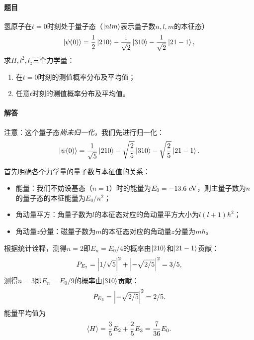 \begin{tcolorbox}[breakable, title={\textbf{氢原子能级叠加态}}]
    \paragraph{题目}
    氢原子在$t=0$时刻处于量子态（$\ket{nlm}$表示量子数$n,l,m$的本征态）
    \begin{equation}
        \ket{\psi(0)} = \frac12\ket{210} - \frac{1}{\sqrt{2}}\ket{310} - \frac{1}{\sqrt{2}}\ket{21-1},
    \end{equation}
    求$H, l^2, l_z$三个力学量：
    \begin{enumerate}
        \item{在$t=0$时刻的测值概率分布及平均值；}
        \item{任意$t$时刻的测值概率分布及平均值。}
    \end{enumerate}

    \paragraph{解答}

    注意：这个量子态\emph{尚未归一化}，我们先进行归一化：
    \begin{equation}
        \ket{\psi(0)} = \frac{1}{\sqrt{5}}\ket{210} - \sqrt{\frac25}\ket{310} - \sqrt{\frac25}\ket{21-1}.
    \end{equation}

    首先明确各个力学量的量子数与本征值的关系：
    \begin{itemize}
        \item{能量：我们不妨设基态（$n=1$）时的能量为$E_0=-13.6\ \rm{eV}$，则主量子数为$n$的量子态的本征能量为$E_0/n^2$；}
        \item{角动量平方：角量子数为$l$的本征态对应的角动量平方大小为$l(l+1)\hbar^2$；}
        \item{角动量$z$分量：磁量子数为$m$的本征态对应的角动量$z$分量为$m\hbar$。}
    \end{itemize}

    根据统计诠释，测得$n=2$即$E_n=E_0/4$的概率由$\ket{210}$和$\ket{21-1}$贡献：
    \begin{equation}
        P_{E_2} = \abs{1/\sqrt{5}}^2 + \abs{-\sqrt{2/5}}^2 = 3/5,
    \end{equation}
    测得$n=3$即$E_n=E_0/9$的概率由$\ket{310}$贡献：
    \begin{equation}
        P_{E_3} = \abs{-\sqrt{2/5}}^2 = 2/5.
    \end{equation}
    能量平均值为
    \begin{equation}
        \expval{H} = \frac35 E_2 + \frac25 E_3 = \frac{7}{36} E_0.
    \end{equation}


\end{tcolorbox}
